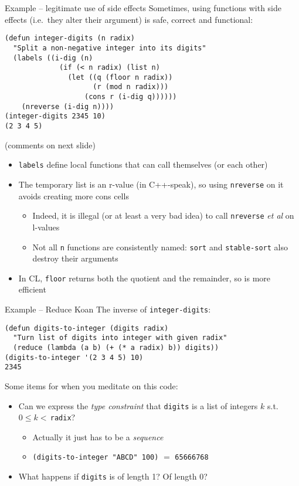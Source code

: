 \documentclass[presentation]{beamer}
\begin{document}
\begin{frame}[fragile]{Example -- legitimate use of side effects}
  Sometimes, using functions with side effects (i.e.\ they alter their argument) is safe, correct and functional:
\begin{verbatim}
(defun integer-digits (n radix)
  "Split a non-negative integer into its digits"
  (labels ((i-dig (n)
             (if (< n radix) (list n)
               (let ((q (floor n radix))
                     (r (mod n radix)))
                   (cons r (i-dig q))))))
    (nreverse (i-dig n))))
(integer-digits 2345 10)
(2 3 4 5)
\end{verbatim}
(comments on next slide)
\end{frame}
\begin{frame}
\begin{itemize}
\item \texttt{labels} define local functions that can call themselves (or each other)
\item The temporary list is an r-value (in C++-speak), so using \texttt{nreverse} on it avoids creating more cons cells
  \begin{itemize}
  \item Indeed, it is illegal (or at least a very bad idea) to call \texttt{nreverse} \emph{et al} on l-values
  \item Not all \texttt{n} functions are consistently named: \texttt{sort} and \texttt{stable-sort} also destroy their arguments
  \end{itemize}
\item In CL, \texttt{floor} returns both the quotient and the remainder, so is more efficient
\end{itemize}

\end{frame}

\begin{frame}[fragile]{Example -- Reduce Koan}
  The inverse of \texttt{integer-digits}:
\begin{verbatim}
(defun digits-to-integer (digits radix)
  "Turn list of digits into integer with given radix"
  (reduce (lambda (a b) (+ (* a radix) b)) digits))
(digits-to-integer '(2 3 4 5) 10)
2345
\end{verbatim}
Some items for when you meditate on this code:
\begin{itemize}
\item Can we express the \emph{type constraint} that \texttt{digits} is a list of integers $k$ s.t.\ $0\leq k<$\,\texttt{radix}?
  \begin{itemize}
  \item Actually it just has to be a \emph{sequence}
  \item \texttt{(digits-to-integer "ABCD" 100)} $=$ \texttt{65666768}
  \end{itemize}
\item What happens if \texttt{digits} is of length 1?  Of length 0?
\end{itemize}

\end{frame}
\end{document}
